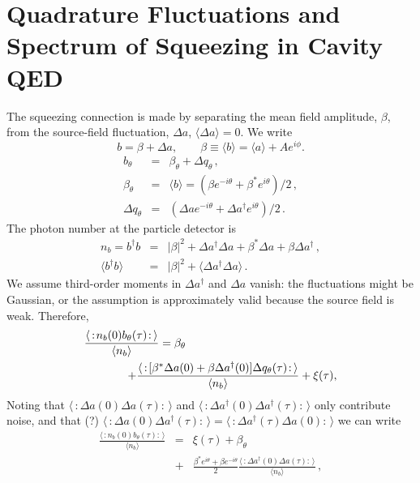 \documentclass[twocolumn,aps,eqsecnum,showkeys,amsmath]{revtex4}
\begin{document}
\section{Quadrature Fluctuations and Spectrum of Squeezing in 
Cavity QED}
The squeezing connection is made by separating the mean field 
amplitude, $\beta$, from the source-field fluctuation, $\Delta a$, 
$\langle \Delta a \rangle =0$. We write
%
\begin{equation}
 b=\beta+\Delta a, 		\qquad 
\beta\equiv\langle b\rangle = \langle a \rangle +Ae^{i\phi}.
\end{equation}
%
\begin{eqnarray}
b_\theta &=& \beta_\theta +\Delta q_\theta \,,	\nonumber	\\
\beta_\theta &=& \langle b \rangle = 
	(\beta e^{-i\theta} +\beta^\ast e^{i\theta} )/2 \,, \nonumber	\\
\Delta q_\theta &=& 
  (\Delta a e^{-i\theta} +\Delta a^\dag e^{i\theta} )/2 \,.
\end{eqnarray}
The photon number at the particle detector is 
%
\begin{eqnarray}
n_b = b^\dag b &=& |\beta|^2 +\Delta a^\dag\Delta a  
	+\beta^\ast\Delta a +\beta\Delta a^\dag	\,,  \nonumber		\\
\langle b^\dag b\rangle &=& 
	|\beta|^2 + \langle \Delta a^\dag \Delta a \rangle \,.
\end{eqnarray}
We assume third-order moments in $\Delta a^\dagger$ and $\Delta a$ 
vanish: the fluctuations might be Gaussian, or the assumption is
approximately valid because the source field is weak. Therefore, 
%
\begin{eqnarray}
\lefteqn{
\frac{\langle\,:\! n_b(0) b_\theta(\tau)\!:\,\rangle}{\langle n_b\rangle} 
	= \beta_\theta } \hspace{1cm} \nonumber\\ 
	&& +\frac{\langle\,:\! [\beta^\ast \Delta a(0) 
	+\beta\Delta a^\dag(0)] \Delta q_\theta(\tau)\!:\,\rangle}
	{\langle n_b\rangle} +\xi(\tau),		\nonumber\\ 				
\end{eqnarray}
Noting that 
$\langle\,:\! \Delta a(0)\Delta a(\tau)\!:\,\rangle$ and 
$\langle\,:\! \Delta a^\dag(0)\Delta a^\dag(\tau)\!:\,\rangle$ 
only contribute noise, and that (?) 
$\langle\,:\! \Delta a(0)\Delta a^\dag(\tau)\!:\,\rangle = 
\langle\,:\! \Delta a^\dag(\tau)\Delta a(0)\!:\,\rangle$  
we can write
%
\begin{eqnarray}
\frac{\langle\,:\! n_b(0) b_\theta(\tau)\!:\,\rangle}{\langle n_b\rangle} 
	&=& \xi(\tau) + \beta_{\theta} \nonumber \\
	&+& \frac{\beta^\ast e^{i\theta} +\beta e^{-i\theta} }{2} 
	 \frac{\langle\,:\! \Delta a^\dag (0) \Delta a (\tau)\!:\,\rangle}
	{\langle n_b\rangle}  \,, \nonumber \\	
\end{eqnarray}
\end{document}
